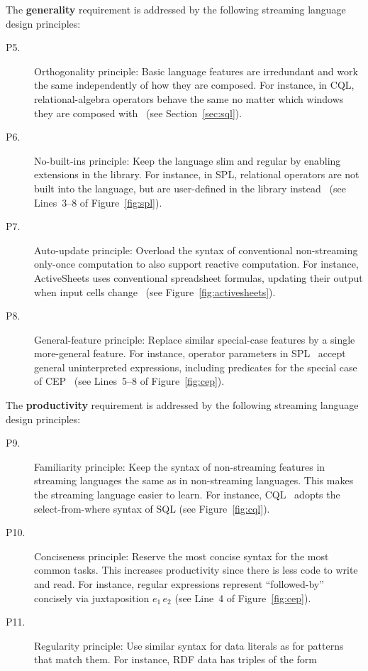 The \textbf{generality} requirement is addressed by the following
streaming language design principles:
\begin{description}
  \item[P5.] Orthogonality principle: Basic language features are
    irredundant and work the same independently of how they are
    composed. For instance, in CQL, relational-algebra operators
    behave the same no matter which windows they are composed
    with~\cite{arasu_babu_widom_2006} (see Section~\ref{sec:sql}).
  \item[P6.] No-built-ins principle: Keep the language slim and
    regular by enabling extensions in the library. For instance, in
    SPL, relational operators are not built into the language, but are
    user-defined in the library
    instead~\cite{hirzel_schneider_gedik_2017} (see \mbox{Lines 3--8}
    of Figure~\ref{fig:spl}).
  \item[P7.] Auto-update principle: Overload the syntax of conventional
    non-streaming only-once computation to also support reactive
    computation. For instance, ActiveSheets uses conventional
    spreadsheet formulas, updating their output when input cells
    change~\cite{vaziri_et_al_2014} (see Figure~\ref{fig:activesheets}).
  \item[P8.] General-feature principle: Replace similar special-case
    features by a single more-general feature. For instance, operator
    parameters in SPL~\cite{hirzel_schneider_gedik_2017} accept
    general uninterpreted expressions, including predicates for the
    special case of CEP~\cite{hirzel_2012} (see \mbox{Lines 5--8} of
    Figure~\ref{fig:cep}).
\end{description}

The \textbf{productivity} requirement is addressed by the following
streaming language design principles:
\begin{description}
  \item[P9.] Familiarity principle: Keep the syntax of non-streaming
    features in streaming languages the same as in non-streaming
    languages. This makes the streaming language easier to learn. For
    instance, CQL~\cite{arasu_widom_2004} adopts the select-from-where
    syntax of SQL (see Figure~\ref{fig:cql}).
  \item[P10.] Conciseness principle: Reserve the most concise syntax
    for the most common tasks. This increases productivity since there
    is less code to write and read. For instance, regular expressions
    represent ``followed-by'' concisely via juxtaposition
    \mbox{$e_1\,e_2$} (see Line~4 of Figure~\ref{fig:cep}).
  \item[P11.] Regularity principle: Use similar syntax for data
    literals as for patterns that match them. For instance, RDF data
    has triples of the form
\end{description}

